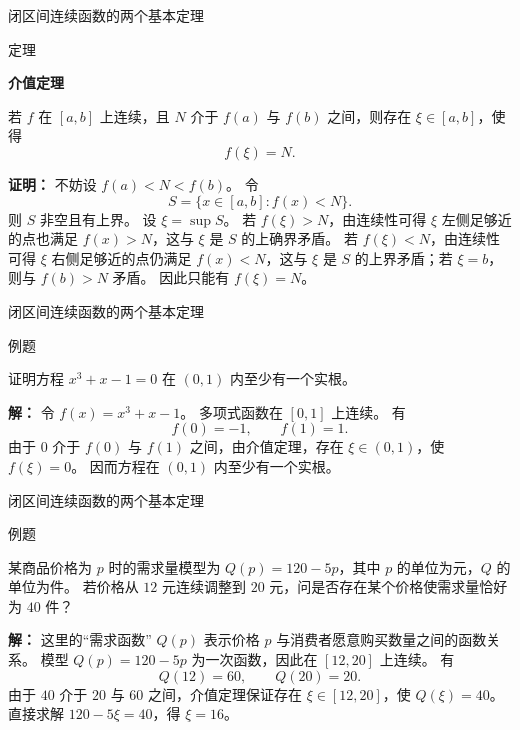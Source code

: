 \documentclass[aspectratio=169,10pt,fontset=fandol]{ctexbeamer}
\begin{document}
\begin{frame}[t,fragile]{闭区间连续函数的两个基本定理}
\normalsize
\begin{block}{定理}
{\normalsize
\textbf{介值定理}\par

若 $f$ 在 $[a,b]$ 上连续，且 $N$ 介于 $f(a)$ 与 $f(b)$ 之间，则存在 $\xi\in[a,b]$，使得
\[
f(\xi)=N.
\]

}
\end{block}
\pause
{\normalsize
\textbf{证明：}
不妨设 $f(a)<N<f(b)$。 令
\[
S=\{x\in[a,b]:f(x)<N\}.
\]
则 $S$ 非空且有上界。 设 $\xi=\sup S$。 若 $f(\xi)>N$，由连续性可得 $\xi$ 左侧足够近的点也满足 $f(x)>N$，这与 $\xi$ 是 $S$ 的上确界矛盾。 若 $f(\xi)<N$，由连续性可得 $\xi$ 右侧足够近的点仍满足 $f(x)<N$，这与 $\xi$ 是 $S$ 的上界矛盾；若 $\xi=b$，则与 $f(b)>N$ 矛盾。 因此只能有 $f(\xi)=N$。

}
\end{frame}
\begin{frame}[t,fragile]{闭区间连续函数的两个基本定理}
\normalsize
\begin{block}{例题}
{\normalsize
证明方程 $x^3+x-1=0$ 在 $(0,1)$ 内至少有一个实根。

}
\end{block}
\pause
{\normalsize
\textbf{解：}
令 $f(x)=x^3+x-1$。 多项式函数在 $[0,1]$ 上连续。 有
\[
f(0)=-1,\qquad f(1)=1.
\]
由于 $0$ 介于 $f(0)$ 与 $f(1)$ 之间，由介值定理，存在 $\xi\in(0,1)$，使 $f(\xi)=0$。 因而方程在 $(0,1)$ 内至少有一个实根。

}
\end{frame}
\begin{frame}[t,fragile]{闭区间连续函数的两个基本定理}
\normalsize
\begin{block}{例题}
{\normalsize
某商品价格为 $p$ 时的需求量模型为 $Q(p)=120-5p$，其中 $p$ 的单位为元，$Q$ 的单位为件。 若价格从 $12$ 元连续调整到 $20$ 元，问是否存在某个价格使需求量恰好为 $40$ 件？

}
\end{block}
\pause
{\normalsize
\textbf{解：}
这里的“需求函数” $Q(p)$ 表示价格 $p$ 与消费者愿意购买数量之间的函数关系。 模型 $Q(p)=120-5p$ 为一次函数，因此在 $[12,20]$ 上连续。 有
\[
Q(12)=60,\qquad Q(20)=20.
\]
由于 $40$ 介于 $20$ 与 $60$ 之间，介值定理保证存在 $\xi\in[12,20]$，使 $Q(\xi)=40$。 直接求解 $120-5\xi=40$，得 $\xi=16$。

}
\end{frame}
\end{document}
